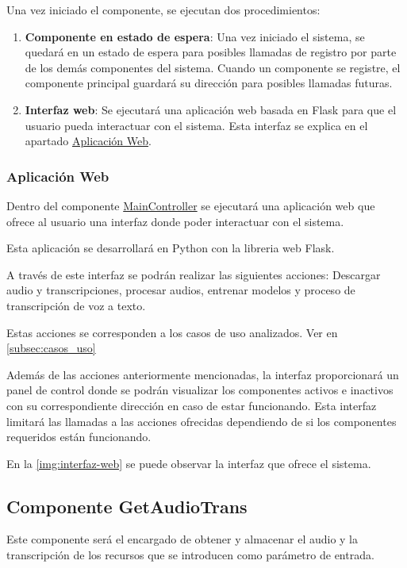 \documentclass[../main.tex]{subfiles}
\begin{document}
Una vez iniciado el componente, se ejecutan dos procedimientos:
\begin{enumerate}
    \item \textbf{Componente en estado de espera}: Una vez iniciado el sistema, se quedará en un estado de espera para posibles llamadas de registro por parte de los demás componentes del sistema. Cuando un componente se registre, el componente principal guardará su dirección para posibles llamadas futuras.
    \item \textbf{Interfaz web}: Se ejecutará una aplicación web basada en Flask para que el usuario pueda interactuar con el sistema. Esta interfaz se explica en el apartado \hyperref[subsubsec:aplicacionweb]{Aplicación Web}.
\end{enumerate}

\subsubsection{Aplicación Web}\label{subsubsec:aplicacionweb}
Dentro del componente \hyperref[par:maincontroller]{MainController} se ejecutará una aplicación web que ofrece al usuario una interfaz donde poder interactuar con el sistema.

Esta aplicación se desarrollará en Python con la libreria web Flask.

A través de este interfaz se podrán realizar las siguientes acciones: Descargar audio y transcripciones, procesar audios, entrenar modelos y proceso de transcripción de voz a texto.

Estas acciones se corresponden a los casos de uso analizados. Ver en \autoref{subsec:casos_uso}

Además de las acciones anteriormente mencionadas, la interfaz proporcionará un panel de control donde se podrán visualizar los componentes activos e inactivos con su correspondiente dirección en caso de estar funcionando. Esta interfaz limitará las llamadas a las acciones ofrecidas dependiendo de si los componentes requeridos están funcionando.

En la \autoref{img:interfaz-web} se puede observar la interfaz que ofrece el sistema.


\subsection{Componente GetAudioTrans}\label{subsec:impl_getaudiotrans}
Este componente será el encargado de obtener y almacenar el audio y la transcripción de los recursos que se introducen como parámetro de entrada.
\end{document}

